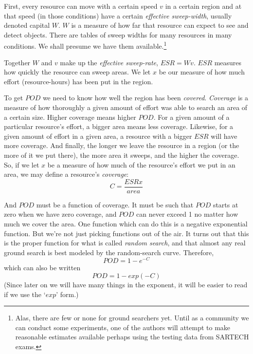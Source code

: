 \documentclass[10pt]{article}
\begin{document}
First, every resource can move with a certain speed $v$ in a certain
region and at that speed (in those conditions) have a certain
\emph{effective sweep-width}, usually denoted capital $W$.  $W$ is a
measure of how far that resource can expect to see and detect objects.
There are tables of sweep widths for many resources in many
conditions. We shall presume we have them available.\footnote{Alas,
  there are few or none for ground searchers yet. Until as a community 
  we can conduct some experiments, one of the authors will attempt to
  make reasonable estimates available perhaps using the testing data
  from SARTECH exams.}

Together $W$ and $v$ make up the \emph{effective sweep-rate}, $ESR = W
v$. $ESR$ measures how quickly the resource can sweep areas. We let
$x$ be our measure of how much effort (resource-hours) has been put in 
the region.

To get $POD$ we need to know how well the region has been
\emph{covered}. \emph{Coverage} is a measure of how thoroughly a given
amount of effort was able to search an area of a certain size. Higher
coverage means higher $POD$. For a given amount of a particular
resource's effort, a bigger area means less coverage. Likewise, for a
given amount of effort in a given area, a resource with a bigger $ESR$
will have more coverage. And finally, the longer we leave the resource
in a region (or the more of it we put there), the more area it sweeps,
and the higher the coverage. So, if we let $x$ be a measure of how
much of the resource's effort we put in an area, we may define a
resource's \emph{coverage}:
\begin{equation}
  \label{eq:C}
  C = \frac{ESR x}{area}
\end{equation}

And $POD$ must be a function of coverage. It must be such that $POD$
starts at zero when we have zero coverage, and $POD$ can 
never exceed 1 no matter how much we cover the area. One function
which can do this is a negative exponential function. But we're not
just picking functions out of the air. It turns out that this is the
proper function for what is called \emph{random search}, and that
almost any real ground search is best modeled by the random-search
curve. \cite{} Therefore,
\begin{equation}
  \label{eq:3}
  POD = 1 - e^{-C}
\end{equation}
which can also be written
\begin{equation}
  \label{eq:9}
  POD = 1 - exp(-C)
\end{equation}
(Since later on we will have many things in the exponent, it will be
easier to read if we use the `$exp$' form.)
\end{document}
